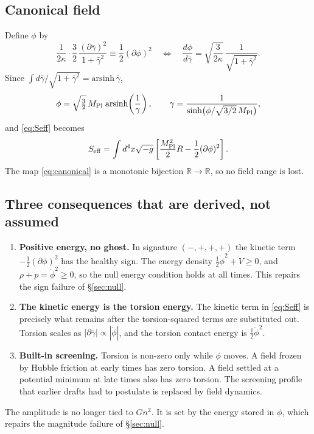 \documentclass[11pt]{article}
\newcommand{\Mp}{M_{\rm Pl}}
\begin{document}
\subsection{Canonical field}
Define $\phi$ by
\begin{equation}
\frac{1}{2\kappa}\cdot\frac32\,\frac{(\partial\bar\gamma)^2}{1+\bar\gamma^2}
\equiv\frac12(\partial\phi)^2
\quad\Longleftrightarrow\quad
\frac{d\phi}{d\bar\gamma}=\sqrt{\frac{3}{2\kappa}}\,\frac{1}{\sqrt{1+\bar\gamma^2}} .
\end{equation}
Since $\int d\bar\gamma/\sqrt{1+\bar\gamma^2}=\mathrm{arsinh}\,\bar\gamma$,
\begin{equation}
\phi=\sqrt{\tfrac32}\,\Mp\;\mathrm{arsinh}\!\left(\frac1\gamma\right),
\qquad
\gamma=\frac{1}{\sinh\!\big(\phi/\sqrt{3/2}\,\Mp\big)} ,
\label{eq:canonical}
\end{equation}
and \eqref{eq:Seff} becomes
\begin{equation}
S_{\rm eff}=\int d^4x\sqrt{-g}\left[\frac{\Mp^2}{2}R-\frac12(\partial\phi)^2\right].
\label{eq:canonical_action}
\end{equation}
The map \eqref{eq:canonical} is a monotonic bijection $\mathbb{R}\to\mathbb{R}$, so no field
range is lost.

\subsection{Three consequences that are derived, not assumed}
\begin{enumerate}
\item \textbf{Positive energy, no ghost.} In signature $(-,+,+,+)$ the kinetic term
$-\frac12(\partial\phi)^2$ has the healthy sign. The energy density
$\frac12\dot\phi^2+V\ge0$, and $\rho+p=\dot\phi^2\ge0$, so the null energy condition holds
at all times. This repairs the sign failure of \S\ref{sec:null}.
\item \textbf{The kinetic energy is the torsion energy.} The kinetic term in
\eqref{eq:Seff} is precisely what remains after the torsion-squared terms are
substituted out. Torsion scales as $|\partial\bar\gamma|\propto|\dot\phi|$, and the
torsion contact energy is $\frac12\dot\phi^2$.
\item \textbf{Built-in screening.} Torsion is non-zero only while $\phi$ moves. A field
frozen by Hubble friction at early times has zero torsion. A field settled at a potential
minimum at late times also has zero torsion. The screening profile that earlier drafts
had to postulate is replaced by field dynamics.
\end{enumerate}
The amplitude is no longer tied to $Gn^2$. It is set by the energy stored in $\phi$, which
repairs the magnitude failure of \S\ref{sec:null}.
\end{document}
